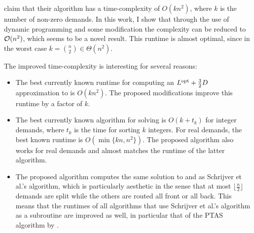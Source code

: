 \citet{schrijver99} claim that their algorithm has a time-complexity of $O(k n^2)$, where $k$ is the number of non-zero demands.
In this work, I show that through the use of dynamic programming and some modification the complexity can be reduced to $\mathcal{O}(n^2)$, which seems to be a novel result.
This runtime is almost optimal, since in the worst case $k = \binom{n}{2} \in \Theta(n^2)$.

The improved time-complexity is interesting for several reasons:
\begin{itemize}
	\item The best currently known runtime for computing an $L^{\mathrm{opt}} + \frac{3}{2}D$ approximation to \RL is $O(k n^2)$.
	The proposed modifications improve this runtime by a factor of $k$.
	\item The best currently known algorithm for solving \RRL is $O(k + t_k)$ for integer demands, where $t_k$ is the time for sorting $k$ integers.
	For real demands, the best known runtime is $O(\min\{kn, n^2\})$.
	The proposed algorithm also works for real demands and almost matches the runtime of the latter algorithm.
	\item The proposed algorithm computes the same solution to \RL and \RRL as Schrijver et al.'s algorithm, which is particularly aesthetic in the sense that at most $\lfloor\frac{n}{2}\rfloor$ demands are split while the others are routed all front or all back.
	This means that the runtimes of all algorithms that use Schrijver et al.'s algorithm as a subroutine are improved as well, in particular that of the PTAS algorithm by \citet{khanna97}.
\end{itemize}


%
%
%
